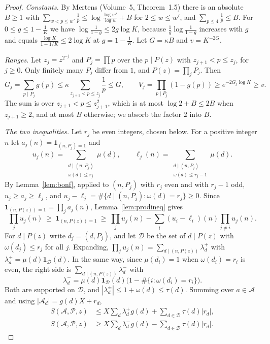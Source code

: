 \begin{proof}
\emph{Constants.} By Mertens (Volume~5, Theorem~1.5) there is an absolute $B\ge1$ with $\sum_{w<p\le w'}\frac1p\le\log\frac{\log w'}{\log w}+B$ for $2\le w\le w'$, and $\sum_{p\le4}\frac1p\le B$. For $0\le g\le1-\frac1K$ we have $\log\frac1{1-g}\le2g\log K$, because $\frac1g\log\frac1{1-g}$ increases with $g$ and equals $\frac{\log K}{1-1/K}\le2\log K$ at $g=1-\frac1K$. Let $G=\kappa B$ and $v=K^{-2G}$.

\emph{Ranges.} Let $z_j=z^{2^{-j}}$ and $P_j=\prod p$ over the $p\mid P(z)$ with $z_{j+1}<p\le z_j$, for $j\ge0$. Only finitely many $P_j$ differ from $1$, and $P(z)=\prod_jP_j$. Then
\[
G_j=\sum_{p\mid P_j}g(p)\le\kappa\sum_{z_{j+1}<p\le z_j}\frac1p\le G,\qquad V_j=\prod_{p\mid P_j}(1-g(p))\ge e^{-2G_j\log K}\ge v.
\]
The sum is over $z_{j+1}<p\le z_{j+1}^2$, which is at most $\log2+B\le2B$ when $z_{j+1}\ge2$, and at most $B$ otherwise; we absorb the factor $2$ into $B$.

\emph{The two inequalities.} Let $r_j$ be even integers, chosen below. For a positive integer $n$ let $a_j(n)=\mathbf 1_{(n,P_j)=1}$ and
\[
u_j(n)=\sum_{\substack{d\mid(n,P_j)\\\omega(d)\le r_j}}\mu(d),\qquad\ell_j(n)=\sum_{\substack{d\mid(n,P_j)\\\omega(d)\le r_j-1}}\mu(d).
\]
By Lemma~\ref{lem:bonf}, applied to $(n,P_j)$ with $r_j$ even and with $r_j-1$ odd, $u_j\ge a_j\ge\ell_j$, and $u_j-\ell_j=\#\{d\mid(n,P_j):\omega(d)=r_j\}\ge0$. Since $\mathbf 1_{(n,P(z))=1}=\prod_ja_j(n)$, Lemma~\ref{lem:prodineq} gives
\[
\prod_ju_j(n)\ \ge\ \mathbf 1_{(n,P(z))=1}\ \ge\ \prod_ju_j(n)-\sum_i(u_i-\ell_i)(n)\prod_{j\ne i}u_j(n).
\]
For $d\mid P(z)$ write $d_j=(d,P_j)$, and let $\mathcal D$ be the set of $d\mid P(z)$ with $\omega(d_j)\le r_j$ for all $j$. Expanding, $\prod_ju_j(n)=\sum_{d\mid(n,P(z))}\lambda^+_d$ with $\lambda^+_d=\mu(d)\mathbf 1_{\mathcal D}(d)$. In the same way, since $\mu(d_i)=1$ when $\omega(d_i)=r_i$ is even, the right side is $\sum_{d\mid(n,P(z))}\lambda^-_d$ with
\[
\lambda^-_d=\mu(d)\mathbf 1_{\mathcal D}(d)\bigl(1-\#\{i:\omega(d_i)=r_i\}\bigr).
\]
Both are supported on $\mathcal D$, and $|\lambda^\pm_d|\le1+\omega(d)\le\tau(d)$. Summing over $a\in\mathcal A$ and using $|\mathcal A_d|=g(d)X+r_d$,
\begin{equation}\label{eq:flsandwich}
\begin{aligned}S(\mathcal A,\mathcal P,z)&\le X\sum_d\lambda^+_dg(d)+\sum_{d\in\mathcal D}\tau(d)|r_d|,\\S(\mathcal A,\mathcal P,z)&\ge X\sum_d\lambda^-_dg(d)-\sum_{d\in\mathcal D}\tau(d)|r_d|.\end{aligned}
\end{equation}


\end{proof}
